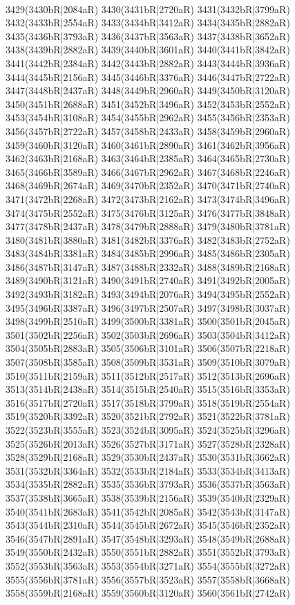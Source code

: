 \\3429(3430bR|2084aR) 3430(3431bR|2720aR) 3431(3432bR|3799aR) 3432(3433bR|2554aR) 3433(3434bR|3412aR) 3434(3435bR|2882aR) 3435(3436bR|3793aR) 3436(3437bR|3563aR) 3437(3438bR|3652aR) \\3438(3439bR|2882aR) 3439(3440bR|3601aR) 3440(3441bR|3842aR) 3441(3442bR|2384aR) 3442(3443bR|2882aR) 3443(3444bR|3936aR) 3444(3445bR|2156aR) 3445(3446bR|3376aR) 3446(3447bR|2722aR) \\3447(3448bR|2437aR) 3448(3449bR|2960aR) 3449(3450bR|3120aR) 3450(3451bR|2688aR) 3451(3452bR|3496aR) 3452(3453bR|2552aR) 3453(3454bR|3108aR) 3454(3455bR|2962aR) 3455(3456bR|2353aR) \\3456(3457bR|2722aR) 3457(3458bR|2433aR) 3458(3459bR|2960aR) 3459(3460bR|3120aR) 3460(3461bR|2890aR) 3461(3462bR|3956aR) 3462(3463bR|2168aR) 3463(3464bR|2385aR) 3464(3465bR|2730aR) \\3465(3466bR|3589aR) 3466(3467bR|2962aR) 3467(3468bR|2246aR) 3468(3469bR|2674aR) 3469(3470bR|2352aR) 3470(3471bR|2740aR) 3471(3472bR|2268aR) 3472(3473bR|2162aR) 3473(3474bR|3496aR) \\3474(3475bR|2552aR) 3475(3476bR|3125aR) 3476(3477bR|3848aR) 3477(3478bR|2437aR) 3478(3479bR|2888aR) 3479(3480bR|3781aR) 3480(3481bR|3880aR) 3481(3482bR|3376aR) 3482(3483bR|2752aR) \\3483(3484bR|3381aR) 3484(3485bR|2996aR) 3485(3486bR|2305aR) 3486(3487bR|3147aR) 3487(3488bR|2332aR) 3488(3489bR|2168aR) 3489(3490bR|3121aR) 3490(3491bR|2740aR) 3491(3492bR|2005aR) \\3492(3493bR|3182aR) 3493(3494bR|2076aR) 3494(3495bR|2552aR) 3495(3496bR|3387aR) 3496(3497bR|2507aR) 3497(3498bR|3037aR) 3498(3499bR|2510aR) 3499(3500bR|3381aR) 3500(3501bR|2045aR) \\3501(3502bR|2256aR) 3502(3503bR|2696aR) 3503(3504bR|3412aR) 3504(3505bR|2883aR) 3505(3506bR|3101aR) 3506(3507bR|2218aR) 3507(3508bR|3585aR) 3508(3509bR|3531aR) 3509(3510bR|3079aR) \\3510(3511bR|2159aR) 3511(3512bR|2517aR) 3512(3513bR|2696aR) 3513(3514bR|2438aR) 3514(3515bR|2540aR) 3515(3516bR|3353aR) 3516(3517bR|2720aR) 3517(3518bR|3799aR) 3518(3519bR|2554aR) \\3519(3520bR|3392aR) 3520(3521bR|2792aR) 3521(3522bR|3781aR) 3522(3523bR|3555aR) 3523(3524bR|3095aR) 3524(3525bR|3296aR) 3525(3526bR|2013aR) 3526(3527bR|3171aR) 3527(3528bR|2328aR) \\3528(3529bR|2168aR) 3529(3530bR|2437aR) 3530(3531bR|3662aR) 3531(3532bR|3364aR) 3532(3533bR|2184aR) 3533(3534bR|3413aR) 3534(3535bR|2882aR) 3535(3536bR|3793aR) 3536(3537bR|3563aR) \\3537(3538bR|3665aR) 3538(3539bR|2156aR) 3539(3540bR|2329aR) 3540(3541bR|2683aR) 3541(3542bR|2085aR) 3542(3543bR|3147aR) 3543(3544bR|2310aR) 3544(3545bR|2672aR) 3545(3546bR|2352aR) \\3546(3547bR|2891aR) 3547(3548bR|3293aR) 3548(3549bR|2688aR) 3549(3550bR|2432aR) 3550(3551bR|2882aR) 3551(3552bR|3793aR) 3552(3553bR|3563aR) 3553(3554bR|3271aR) 3554(3555bR|3272aR) \\3555(3556bR|3781aR) 3556(3557bR|3523aR) 3557(3558bR|3668aR) 3558(3559bR|2168aR) 3559(3560bR|3120aR) 3560(3561bR|2742aR) 